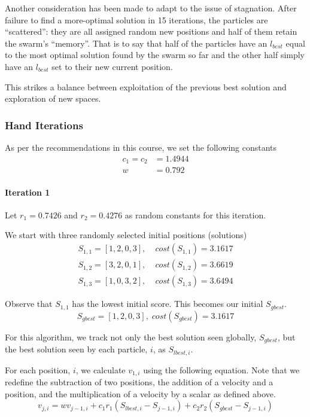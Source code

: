 \documentclass[a4paper]{article}
\newcommand{\subsubsubsection}[1]{\paragraph{#1} \mbox{}}
\begin{document}
Another consideration has been made to adapt to the issue of stagnation. After failure to find a more-optimal solution in 15 iterations, the particles are ``scattered'': they are all assigned random new positions and half of them retain the swarm's ``memory''. That is to say that half of the particles have an $l_\mathit{best}$ equal to the most optimal solution found by the swarm so far and the other half simply have an $l_\mathit{best}$ set to their new current position.

This strikes a balance between exploitation of the previous best solution and exploration of new spaces.

\subsubsection{Hand Iterations}

As per the recommendations in this course, we set the following constants
\begin{align*}
c_1 = c_2 & = 1.4944 \\
w & = 0.792
\end{align*}

\subsubsubsection{Iteration 1}

Let $r_1 = 0.7426$ and $r_2 = 0.4276$ as random constants for this iteration.

We start with three randomly selected initial positions (solutions)
\begin{align*}
S_{1,1} = [1, 2, 0, 3], & \; cost(S_{1,1}) = 3.1617 \\
S_{1,2} = [3, 2, 0, 1], & \; cost(S_{1,2}) = 3.6619 \\
S_{1,3} = [1, 0, 3, 2], & \; cost(S_{1,3}) = 3.6494
\end{align*}

Observe that $S_{1,1}$ has the lowest initial score. This becomes our initial $S_\mathit{gbest}$.
$$S_\mathit{gbest} = [1, 2, 0, 3], \; cost(S_\mathit{gbest}) = 3.1617$$

For this algorithm, we track not only the best solution seen globally,
$S_\mathit{gbest}$, but the best solution seen by each particle, $i$, as
$S_{\mathit{lbest}, i}$.

For each position, $i$, we calculate
$v_{1,i}$ using the following equation. Note that we redefine the subtraction of
two positions, the addition of a velocity and a position, and the multiplication
of a velocity by a scalar as defined above\cite{DiscretePSO}.
$$
v_{j,i} =
  w v_{j-1, i} +
  c_1 r_1 (S_{\mathit{lbest}, i} - S_{j-1, i}) +
  c_2 r_2 (S_\mathit{gbest} - S_{j-1, i})
$$
\end{document}
